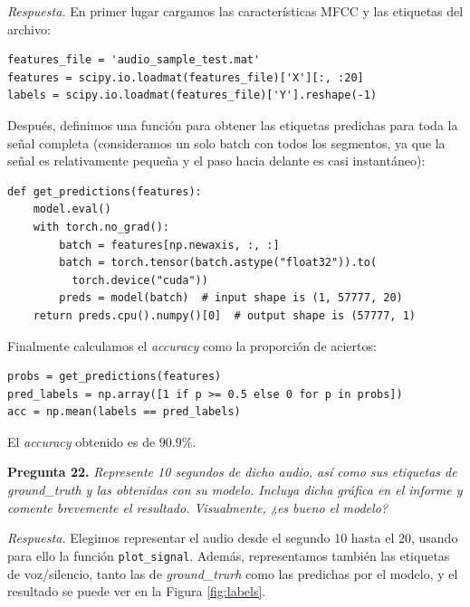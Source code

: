 \documentclass[11pt]{article}
\begin{document}
\textit{Respuesta.} En primer lugar cargamos las características MFCC y las etiquetas del archivo:
\begin{verbatim}
features_file = 'audio_sample_test.mat'
features = scipy.io.loadmat(features_file)['X'][:, :20]
labels = scipy.io.loadmat(features_file)['Y'].reshape(-1)
\end{verbatim}

Después, definimos una función para obtener las etiquetas predichas para toda la señal completa (consideramos un solo batch con todos los segmentos, ya que la señal es relativamente pequeña y el paso hacia delante es casi instantáneo):
\begin{verbatim}
def get_predictions(features):
    model.eval()
    with torch.no_grad():
        batch = features[np.newaxis, :, :]
        batch = torch.tensor(batch.astype("float32")).to(
          torch.device("cuda"))
        preds = model(batch)  # input shape is (1, 57777, 20)
    return preds.cpu().numpy()[0]  # output shape is (57777, 1)
\end{verbatim}

Finalmente calculamos el \textit{accuracy} como la proporción de aciertos:
\begin{verbatim}
probs = get_predictions(features)
pred_labels = np.array([1 if p >= 0.5 else 0 for p in probs])
acc = np.mean(labels == pred_labels)
\end{verbatim}

El \textit{accuracy} obtenido es de $90.9\%$.

\textbf{Pregunta 22.} \textit{Represente 10 segundos de dicho audio, así como sus etiquetas de ground\_truth y las obtenidas con su modelo. Incluya dicha gráfica en el informe y comente brevemente el resultado. Visualmente, ¿es bueno el modelo?}

\textit{Respuesta.} Elegimos representar el audio desde el segundo 10 hasta el 20, usando para ello la función \texttt{plot\_signal}. Además, representamos también las etiquetas de voz/silencio, tanto las de \textit{ground\_trurh} como las predichas por el modelo, y el resultado se puede ver en la Figura \ref{fig:labels}.
\end{document}
